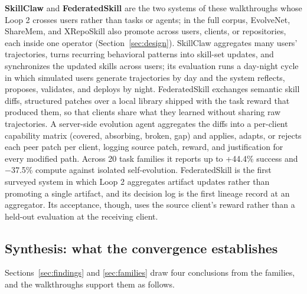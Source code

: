 \documentclass[
  11pt,
]{article}
\begin{document}
\textbf{SkillClaw} \cite{ma2026skillclaw} and \textbf{FederatedSkill} \cite{yang2026federatedskill} are the two systems of these walkthroughs whose Loop 2 crosses users rather than tasks or agents; in the full corpus, EvolveNet, ShareMem, and XRepoSkill also promote across users, clients, or repositories, each inside one operator (Section~\ref{sec:design}). SkillClaw aggregates many users' trajectories, turns recurring behavioral patterns into skill-set updates, and synchronizes the updated skills across users; its evaluation runs a day-night cycle in which simulated users generate trajectories by day and the system reflects, proposes, validates, and deploys by night. FederatedSkill exchanges semantic skill diffs, structured patches over a local library shipped with the task reward that produced them, so that clients share what they learned without sharing raw trajectories. A server-side evolution agent aggregates the diffs into a per-client capability matrix (covered, absorbing, broken, gap) and applies, adapts, or rejects each peer patch per client, logging source patch, reward, and justification for every modified path. Across 20 task families it reports up to +44.4\% success and −37.5\% compute against isolated self-evolution. FederatedSkill is the first surveyed system in which Loop 2 aggregates artifact updates rather than promoting a single artifact, and its decision log is the first lineage record at an aggregator. Its acceptance, though, uses the source client's reward rather than a held-out evaluation at the receiving client.

\subsection{Synthesis: what the convergence establishes}\label{app:families-9}

Sections~\ref{sec:findings} and \ref{sec:families} draw four conclusions from the families, and the walkthroughs support them as follows.
\end{document}
